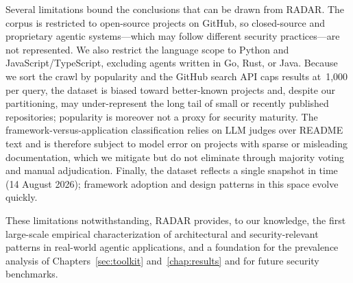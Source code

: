 Several limitations bound the conclusions that can be drawn from RADAR. The corpus is restricted to open-source projects on GitHub, so closed-source and proprietary agentic systems---which may follow different security practices---are not represented. We also restrict the language scope to Python and JavaScript/TypeScript, excluding agents written in Go, Rust, or Java. Because we sort the crawl by popularity and the GitHub search API caps results at~1{,}000 per query, the dataset is biased toward better-known projects and, despite our partitioning, may under-represent the long tail of small or recently published repositories; popularity is moreover not a proxy for security maturity. The framework-versus-application classification relies on LLM judges over README text and is therefore subject to model error on projects with sparse or misleading documentation, which we mitigate but do not eliminate through majority voting and manual adjudication. Finally, the dataset reflects a single snapshot in time (14 August 2026); framework adoption and design patterns in this space evolve quickly.
 
These limitations notwithstanding, RADAR provides, to our knowledge, the first large-scale empirical characterization of architectural and security-relevant patterns in real-world agentic applications, and a foundation for the prevalence analysis of Chapters~\ref{sec:toolkit} and~\ref{chap:results} and for future security benchmarks.





